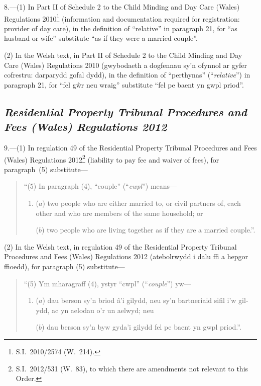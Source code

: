 \documentclass[12pt,a4paper]{article}
\begin{document}
8.—(1) In Part II of Schedule 2 to the Child Minding and Day Care (Wales) Regulations 2010\footnote{S.I.~2010/2574 (W.~214).} (information and documentation required for registration: provider of day care), in the definition of “relative” in paragraph 21, for “as husband or wife” substitute “as if they were a married couple”.

(2) In the Welsh text, in Part II of Schedule 2 to the Child Minding and Day Care (Wales) Regulations 2010 (\foreignlanguage{welsh}{gwybodaeth a dogfennau sy’n ofynnol ar gyfer cofrestru: darparydd gofal dydd}), in the definition of “perthynas” (“\emph{relative}”) in paragraph 21, for “fel g\^wr neu wraig” substitute “fel pe baent yn gwpl priod”.

\subsection*{\itshape\sloppy Residential Property Tribunal Procedures and Fees (Wales) Regulations 2012}

9.—(1) In regulation 49 of the Residential Property Tribunal Procedures and Fees (Wales) Regulations 2012\footnote{S.I.~2012/531 (W.~83), to which there are amendments not relevant to this Order.} (liability to pay fee and waiver of fees), for paragraph~(5) substitute—
\begin{quotation}
“(5) In paragraph (4), “couple” (“\emph{cwpl}”) means—
\begin{enumerate}\item[]
($a$) two people who are either married to, or civil partners of, each other and who are members of the same household; or

($b$) two people who are living together as if they are a married couple.”.
\end{enumerate}
\end{quotation}

(2) In the Welsh text, in regulation 49 of the Residential Property Tribunal Procedures and Fees (Wales) Regulations 2012 (\foreignlanguage{welsh}{atebolrwydd i dalu ffi a hepgor ffioedd}), for paragraph (5) substitute—
\begin{quotation}
“(5) Ym mharagraff (4), ystyr “cwpl” (“\emph{couple}”) yw—
\begin{enumerate}\item[]
\foreignlanguage{welsh}{($a$) dau berson sy’n briod â’i gilydd, neu sy’n bartneriaid sifil i’w gilydd, ac yn aelodau o’r un aelwyd; neu}

($b$) dau berson sy’n byw gyda’i gilydd fel pe baent yn gwpl priod.”.
\end{enumerate}
\end{quotation}
\end{document}
